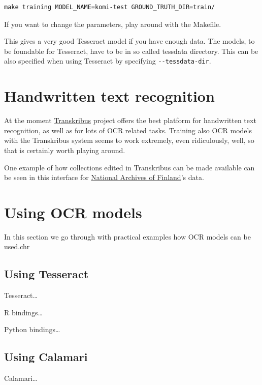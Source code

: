 \documentclass[]{book}
\begin{document}
\begin{verbatim}
make training MODEL_NAME=komi-test GROUND_TRUTH_DIR=train/
\end{verbatim}

If you want to change the parameters, play around with the Makefile.

This gives a very good Tesseract model if you have enough data. The models, to be foundable for Tesseract, have to be in so called tessdata directory. This can be also specified when using Tesseract by specifying \texttt{-\/-tessdata-dir}.

\hypertarget{htr}{%
\chapter{Handwritten text recognition}\label{htr}}

At the moment \href{https://transkribus.eu}{Transkribus} project offers the best platform for handwritten text recognition, as well as for lots of OCR related tasks. Training also OCR models with the Transkribus system seems to work extremely, even ridiculously, well, so that is certainly worth playing around.

One example of how collections edited in Transkribus can be made available can be seen in this interface for \href{https://transkribus.eu/r/kansallisarkisto/}{National Archives of Finland}'s data.

\hypertarget{using-models}{%
\chapter{Using OCR models}\label{using-models}}

In this section we go through with practical examples how OCR models can be used.chr

\hypertarget{using-tesseract}{%
\section{Using Tesseract}\label{using-tesseract}}

Tesseract\ldots{}

R bindings\ldots{}

Python bindings\ldots{}

\hypertarget{using-calamari}{%
\section{Using Calamari}\label{using-calamari}}

Calamari\ldots{}


\end{document}
